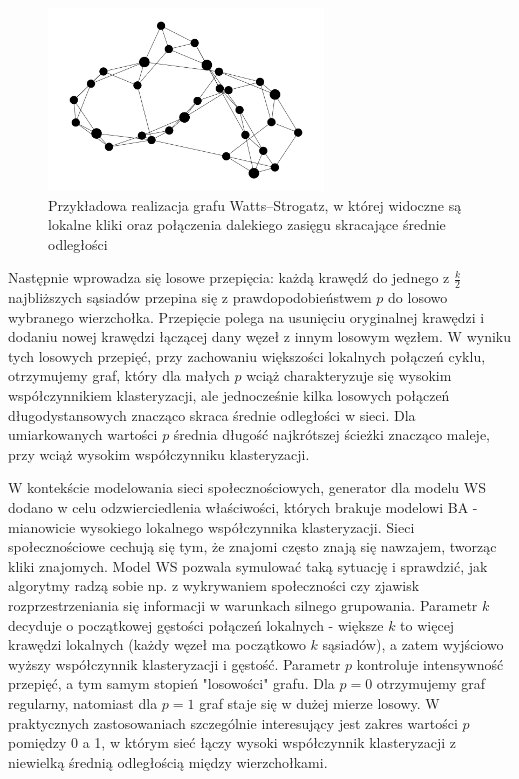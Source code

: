\begin{figure}[h]
    \centering
    \includegraphics[width=0.65\textwidth]{assets/test_data/smallworld.png}
    \caption{Przykładowa realizacja grafu Watts--Strogatz, w której widoczne są lokalne kliki oraz połączenia dalekiego zasięgu skracające średnie odległości}
    \label{fig:WS}
\end{figure}

Następnie wprowadza się losowe przepięcia: każdą krawędź do jednego z $\tfrac{k}{2}$ najbliższych sąsiadów przepina się z prawdopodobieństwem $p$ do losowo wybranego wierzchołka. Przepięcie polega na usunięciu oryginalnej krawędzi i dodaniu nowej krawędzi łączącej dany węzeł z innym losowym węzłem. W wyniku tych losowych przepięć, przy zachowaniu większości lokalnych połączeń cyklu, otrzymujemy graf, który dla małych $p$ wciąż charakteryzuje się wysokim współczynnikiem klasteryzacji, ale jednocześnie kilka losowych połączeń długodystansowych znacząco skraca średnie odległości w sieci.
Dla umiarkowanych wartości $p$ średnia długość najkrótszej ścieżki znacząco maleje, przy wciąż wysokim współczynniku klasteryzacji.

W kontekście modelowania sieci społecznościowych, generator dla modelu WS dodano w celu odzwierciedlenia właściwości, których brakuje modelowi BA - mianowicie wysokiego lokalnego współczynnika klasteryzacji. Sieci społecznościowe cechują się tym, że znajomi często znają się nawzajem, tworząc kliki znajomych. Model WS pozwala symulować taką sytuację i sprawdzić, jak algorytmy radzą sobie np. z wykrywaniem społeczności czy zjawisk rozprzestrzeniania się informacji w warunkach silnego grupowania. Parametr $k$ decyduje o początkowej gęstości połączeń lokalnych - większe $k$ to więcej krawędzi lokalnych (każdy węzeł ma początkowo $k$ sąsiadów), a zatem wyjściowo wyższy współczynnik klasteryzacji i gęstość. Parametr $p$ kontroluje intensywność przepięć, a tym samym stopień "losowości" grafu.
Dla $p=0$ otrzymujemy graf regularny, natomiast dla $p=1$ graf staje się w dużej mierze losowy.
W praktycznych zastosowaniach szczególnie interesujący jest zakres wartości $p$ pomiędzy 0 a 1, w którym sieć łączy wysoki współczynnik klasteryzacji z niewielką średnią odległością między wierzchołkami.


